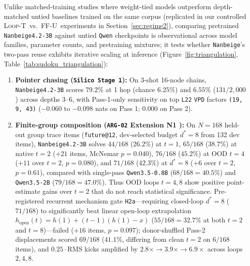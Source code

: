 \documentclass[10pt,letterpaper]{article}
\newcommand{\LoopT}{\textsc{Loop-T}}
\newcommand{\FFU}{\textsc{FF-U}}
\begin{document}
Unlike matched-training studies where weight-tied models outperform depth-matched untied baselines trained on the same corpus \cite{sesodia2026inside} (replicated in our controlled \LoopT\ vs.\ \FFU\ experiments in Section~\ref{sec:regime2}), comparing pretrained \texttt{Nanbeige4.2-3B} against untied \texttt{Qwen} checkpoints is observational across model families, parameter counts, and pretraining mixtures; it tests whether \texttt{Nanbeige}'s two-pass reuse exhibits iterative scaling at inference (Figure~\ref{fig:triangulation}, Table~\ref{tab:sudoku_triangulation}):
\begin{enumerate}[topsep=3pt,itemsep=2pt]
  \item \textbf{Pointer chasing (\texttt{Silico Stage 1}):} On 3-shot 16-node chains, \texttt{Nanbeige4.2-3B} scores $79.2\%$ at 1 hop (chance $6.25\%$) and $6.55\%$ ($131/2{,}000$) across depths 3--6, with Pass-1-only sensitivity on top \texttt{L22} \texttt{VPD} factors \texttt{(19, 9, 43)} ($-0.060$ to $-0.098$ nats on Pass 1; $0.000$ on Pass 2).
  \item \textbf{Finite-group composition (\texttt{ARG-02} Extension N1 \cite{dugan2026arg02}):} On $N=168$ held-out group trace items (\texttt{future@12}, dev-selected budget $d^*=8$ from 132 dev items), \texttt{Nanbeige4.2-3B} solves $44/168$ ($26.2\%$) at $t=1$, $65/168$ ($38.7\%$) at native $t=2$ ($+21$ items, McNemar $p=0.040$), $76/168$ ($45.2\%$) at OOD $t=4$ ($+11$ over $t=2$, $p=0.080$), and $71/168$ ($42.3\%$) at $d^*=8$ ($+6$ over $t=2$, $p=0.61$), compared with single-pass \texttt{Qwen3.5-0.8B} ($68/168 = 40.5\%$) and \texttt{Qwen3.5-2B} ($79/168 = 47.0\%$). Thus OOD loops $t=4,8$ show positive point-estimate gains over $t=2$ that do not reach statistical significance. Pre-registered recurrent mechanism gate \texttt{H2a}—requiring closed-loop $d^*=8$ ($71/168$) to significantly beat linear open-loop extrapolation $h_{\mathrm{open}}(t) = h(1) + (t-1)(h(1)-x)$ ($55/168 = 32.7\%$ at both $t=2$ and $t=8$)—failed ($+16$ items, $p=0.097$); donor-shuffled Pass-2 displacements scored $69/168$ ($41.1\%$, differing from clean $t=2$ on $6/168$ items), and $0.25\cdot\mathrm{RMS}$ kicks amplified by $2.8\times \to 3.9\times \to 6.9\times$ across loops $2, 4, 8$.

\end{enumerate}
\end{document}
